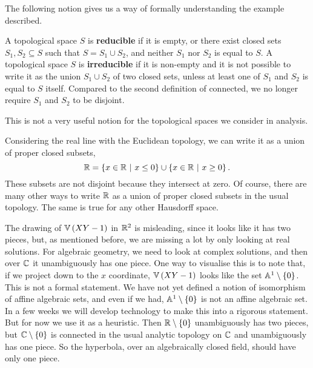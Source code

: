 The following notion gives us a way of formally understanding the example described.

\begin{definition*}
A topological space $ S $ is \textbf{reducible} if it is empty, or there exist closed sets $ S_1, S_2 \subseteq S $ such that $ S = S_1 \cup S_2 $, and neither $ S_1 $ nor $ S_2 $ is equal to $ S $. A topological space $ S $ is \textbf{irreducible} if it is non-empty and it is not possible to write it as the union $ S_1 \cup S_2 $ of two closed sets, unless at least one of $ S_1 $ and $ S_2 $ is equal to $ S $ itself. Compared to the second definition of connected, we no longer require $ S_1 $ and $ S_2 $ to be disjoint.
\end{definition*}

This is not a very useful notion for the topological spaces we consider in analysis.

\begin{example*}
Considering the real line with the Euclidean topology, we can write it as a union of proper closed subsets,
$$ \RR = \cbr{x \in \RR \st x \le 0} \cup \cbr{x \in \RR \st x \ge 0}. $$
These subsets are not disjoint because they intersect at zero. Of course, there are many other ways to write $ \mathbb{R} $ as a union of proper closed subsets in the usual topology. The same is true for any other Hausdorff space.
\end{example*}

\pagebreak

\begin{example*}
The drawing of $ \VV\br{XY - 1} $ in $ \mathbb{R}^2 $ is misleading, since it looks like it has two pieces, but, as mentioned before, we are missing a lot by only looking at real solutions. For algebraic geometry, we need to look at complex solutions, and then over $ \mathbb{C} $ it unambiguously has one piece. One way to visualise this is to note that, if we project down to the $ x $ coordinate, $ \VV\br{XY - 1} $ looks like the set $ \AA^1 \setminus \cbr{0} $. This is not a formal statement. We have not yet defined a notion of isomorphism of affine algebraic sets, and even if we had, $ \AA^1 \setminus \cbr{0} $ is not an affine algebraic set. In a few weeks we will develop technology to make this into a rigorous statement. But for now we use it as a heuristic. Then $ \RR \setminus \cbr{0} $ unambiguously has two pieces, but $ \CC \setminus \cbr{0} $ is connected in the usual analytic topology on $ \mathbb{C} $ and unambiguously has one piece. So the hyperbola, over an algebraically closed field, should have only one piece.
\end{example*}

